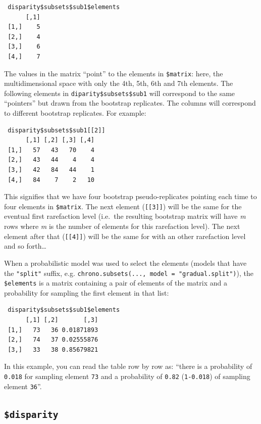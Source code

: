 \documentclass[]{book}
\begin{document}
\begin{verbatim}
 disparity$subsets$sub1$elements
      [,1]
 [1,]    5
 [2,]    4
 [3,]    6
 [4,]    7
\end{verbatim}

The values in the matrix ``point'' to the elements in \texttt{\$matrix}: here, the multidimensional space with only the 4th, 5th, 6th and 7th elements.
The following elements in \texttt{diparity\$subsets\$sub1} will correspond to the same ``pointers'' but drawn from the bootstrap replicates.
The columns will correspond to different bootstrap replicates.
For example:

\begin{verbatim}
 disparity$subsets$sub1[[2]]
      [,1] [,2] [,3] [,4]
 [1,]   57   43   70    4
 [2,]   43   44    4    4
 [3,]   42   84   44    1
 [4,]   84    7    2   10
\end{verbatim}

This signifies that we have four bootstrap pseudo-replicates pointing each time to four elements in \texttt{\$matrix}.
The next element (\texttt{{[}{[}3{]}{]}}) will be the same for the eventual first rarefaction level (i.e.~the resulting bootstrap matrix will have \emph{m} rows where \emph{m} is the number of elements for this rarefaction level).
The next element after that (\texttt{{[}{[}4{]}{]}}) will be the same for with an other rarefaction level and so forth\ldots{}

When a probabilistic model was used to select the elements (models that have the \texttt{"split"} suffix, e.g. \texttt{chrono.subsets(...,\ model\ =\ "gradual.split")}), the \texttt{\$elements} is a matrix containing a pair of elements of the matrix and a probability for sampling the first element in that list:

\begin{verbatim}
 disparity$subsets$sub1$elements
      [,1] [,2]       [,3]
 [1,]   73   36 0.01871893
 [2,]   74   37 0.02555876
 [3,]   33   38 0.85679821
\end{verbatim}

In this example, you can read the table row by row as: ``there is a probability of \texttt{0.018} for sampling element \texttt{73} and a probability of \texttt{0.82} (\texttt{1-0.018}) of sampling element \texttt{36}''.

\hypertarget{disparity}{%
\subsection{\texorpdfstring{\texttt{\$disparity}}{\$disparity}}\label{disparity}}
\end{document}
